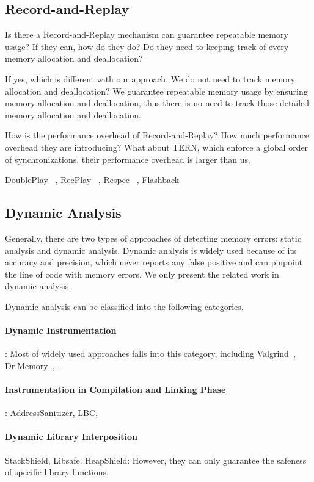 
\subsection{Record-and-Replay}

Is there a Record-and-Replay mechanism can guarantee repeatable memory usage? If they can, how do they do?
Do they need to keeping track of every memory allocation and deallocation?

If yes, which is different with our approach. We do not need to track memory allocation and deallocation?
We guarantee repeatable memory usage by ensuring memory allocation and deallocation, thus 
there is no need to track those detailed memory allocation and deallocation. 

How is the performance overhead of Record-and-Replay? How much performance overhead they are introducing?
What about TERN, which enforce a global order of synchronizations, their performance overhead is larger
than us.

DoublePlay ~\cite{DoublePlay}, RecPlay ~\cite{RecPlay}, Respec ~\cite{Respec}, 
Flashback ~\cite{Flashback}

\subsection{Dynamic Analysis}
Generally, there are two types of approaches of detecting memory errors: static analysis and dynamic analysis. 
Dynamic analysis is widely used because of its accuracy and precision, which never reports any false positive and can pinpoint the line of code with memory errors. We only present the related work in dynamic analysis. 

Dynamic analysis can be classified into the following categories.

\paragraph{Dynamic Instrumentation}: 
Most of widely used approaches falls into this category, including Valgrind~\cite{}, Dr.Memory~\cite{overflow:drmemory}, .

\paragraph{Instrumentation in Compilation and Linking Phase}:
AddressSanitizer, LBC, 

\paragraph{Dynamic Library Interposition}
StackShield, Libsafe. HeapShield: However, they can only guarantee the safeness of specific library functions. 

